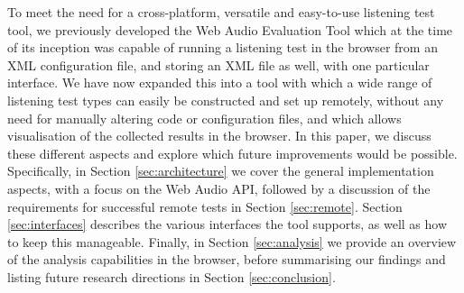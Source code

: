 \documentclass{sig-alternate}
\begin{document}

        To meet the need for a cross-platform, versatile and easy-to-use listening test tool, we previously developed the Web Audio Evaluation Tool \cite{waet} which at the time of its inception was capable of running a listening test in the browser from an XML configuration file, and storing an XML file as well, with one particular interface. We have now expanded this into a tool with which a wide range of listening test types can easily be constructed and set up remotely, without any need for manually altering code or configuration files, and which allows visualisation of the collected results in the browser. In this paper, we discuss these different aspects and explore which future improvements would be possible. Specifically, in Section \ref{sec:architecture} we cover the general implementation aspects, with a focus on the Web Audio API, followed by a discussion of the requirements for successful remote tests in Section \ref{sec:remote}. Section \ref{sec:interfaces} describes the various interfaces the tool supports, as well as how to keep this manageable. Finally, in Section \ref{sec:analysis} we provide an overview of the analysis capabilities in the browser, before summarising our findings and listing future research directions in Section \ref{sec:conclusion}. 
\end{document}
